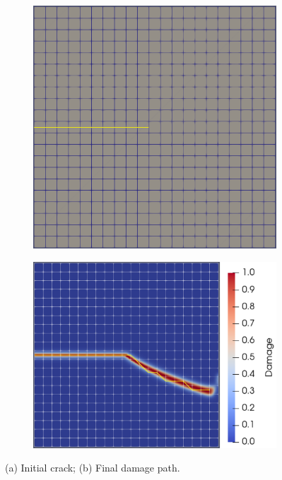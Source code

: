 \begin{figure}[h]
\begin{subfigure}{.45\textwidth}
  \centering
  \includegraphics[width=0.765\linewidth]{Chapter4/figures/nonplanar/3D_example_init.png}
  \caption{}
  \label{fig:init_crack}
\end{subfigure}%
\begin{subfigure}{.54\textwidth}
  \centering
  \includegraphics[width=0.83\linewidth]{Chapter4/figures/nonplanar/nonplanar_example.png}
  \caption{}
  \label{fig:crack_path}
\end{subfigure}%
  \caption{(a) Initial crack; (b) Final damage path.} 
  \label{fig:nonplanar_example}
\end{figure}
